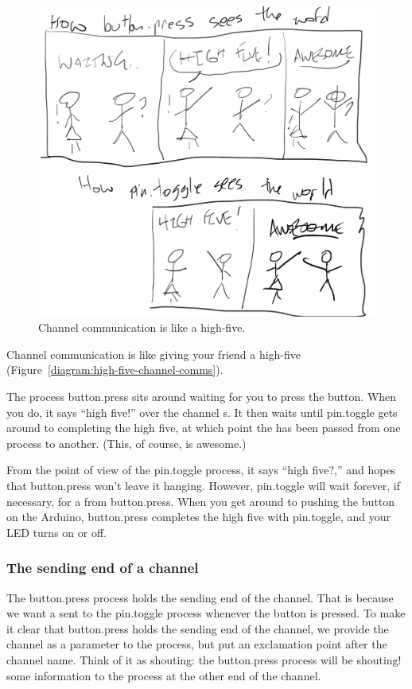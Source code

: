 \begin{figure}[h]
  \begin{center}
    \includegraphics[width=0.8\linewidth]{images/high-five-channel-comms}
    \caption{Channel communication is like a high-five.}
    \label{diagram:high-five-channel-comms}
  \end{center}
\end{figure}

Channel communication is like giving your friend a high-five (Figure~\vref{diagram:high-five-channel-comms}).


The process {\procname button.press} sits around waiting for you to press the button. When you do, it says ``high five!'' over the channel {\code s}. It then waits until {\code pin.toggle} gets around to completing the high five, at which point the \SIGNAL has been passed from one process to another. (This, of course, is awesome.)

From the point of view of the {\procname pin.toggle} process, it says ``high five?,'' and hopes that {\code button.press} won't leave it hanging. However, {\procname pin.toggle} will wait forever, if necessary, for a \SIGNAL from {\procname button.press}. When you get around to pushing the button on the Arduino, {\procname button.press} completes the high five with {\procname pin.toggle}, and your LED turns on or off.


\subsubsection{The sending end of a channel}
The {\procname button.press} process holds the sending end of the channel. That is because we want a \SIGNAL sent to the {\procname pin.toggle} process whenever the button is pressed. To make it clear that {\procname button.press} holds the sending end of the channel, we provide the channel as a parameter to the process, but put an exclamation point after the channel name. Think of it as shouting: the {\procname button.press} process will be shouting! some information to the process at the other end of the channel.

